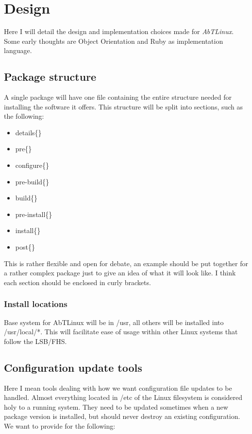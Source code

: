 \newpage
\section{Design}  
Here I will detail the design and implementation choices made for
\emph{AbTLinux}. Some early thoughts are Object Orientation and Ruby 
as implementation language. 

\subsection{Package structure}
A single package will have one file containing the entire structure needed for
installing the software it offers. This structure will be split into sections,
such as the following:
\begin{itemize}
  \item details\{\}
  \item pre\{\}
  \item configure\{\}
  \item pre-build\{\}
  \item build\{\}
  \item pre-install\{\}
  \item install\{\}
  \item post\{\}
\end{itemize}

This is rather flexible and open for debate, an example should be put together
for a rather complex package just to give an idea of what it will look like.
I think each section should be enclosed in curly brackets.

\subsubsection{Install locations}
Base system for AbTLinux will be in /usr, all others will be installed into /usr/local/*.
This will facilitate ease of usage within other Linux systems that follow the LSB/FHS.

\subsection{Configuration update tools}
Here I mean tools dealing with how we want configuration file updates to be
handled. Almost everything located in /etc of the Linux filesystem is considered
holy to a running system. They need to be updated sometimes when a new package
version is installed, but should never destroy an existing configuration. We
want to provide for the following:

